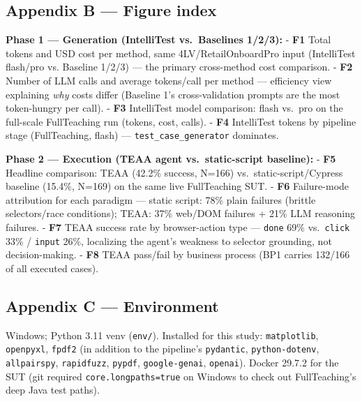 \documentclass[
]{article}
\begin{document}
\subsection{Appendix B --- Figure index}\label{appendix-b-figure-index}

\textbf{Phase 1 --- Generation (IntelliTest vs.~Baselines 1/2/3):} -
\textbf{F1} Total tokens and USD cost per method, same
4LV/RetailOnboardPro input (IntelliTest flash/pro vs. Baseline 1/2/3)
--- the primary cross-method cost comparison. - \textbf{F2} Number of
LLM calls and average tokens/call per method --- efficiency view
explaining \emph{why} costs differ (Baseline 1's cross-validation
prompts are the most token-hungry per call). - \textbf{F3} IntelliTest
model comparison: flash vs.~pro on the full-scale FullTeaching run
(tokens, cost, calls). - \textbf{F4} IntelliTest tokens by pipeline
stage (FullTeaching, flash) --- \texttt{test\_case\_generator}
dominates.

\textbf{Phase 2 --- Execution (TEAA agent vs.~static-script baseline):}
- \textbf{F5} Headline comparison: TEAA (42.2\% success, N=166)
vs.~static-script/Cypress baseline (15.4\%, N=169) on the same live
FullTeaching SUT. - \textbf{F6} Failure-mode attribution for each
paradigm --- static script: 78\% plain failures (brittle selectors/race
conditions); TEAA: 37\% web/DOM failures + 21\% LLM reasoning failures.
- \textbf{F7} TEAA success rate by browser-action type --- \texttt{done}
69\% vs.~\texttt{click} 33\% / \texttt{input} 26\%, localizing the
agent's weakness to selector grounding, not decision-making. -
\textbf{F8} TEAA pass/fail by business process (BP1 carries 132/166 of
all executed cases).

\subsection{Appendix C --- Environment}\label{appendix-c-environment}

Windows; Python 3.11 venv (\texttt{env/}). Installed for this study:
\texttt{matplotlib}, \texttt{openpyxl}, \texttt{fpdf2} (in addition to
the pipeline's \texttt{pydantic}, \texttt{python-dotenv},
\texttt{allpairspy}, \texttt{rapidfuzz}, \texttt{pypdf},
\texttt{google-genai}, \texttt{openai}). Docker 29.7.2 for the SUT (git
required \texttt{core.longpaths=true} on Windows to check out
FullTeaching's deep Java test paths).
\end{document}
